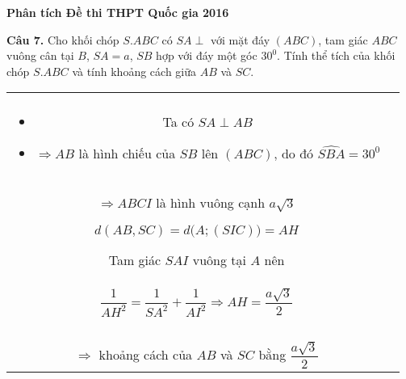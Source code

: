 \documentclass[11pt]{beamer} %
\newcommand{\parallelsum}{\mathbin{\!/\mkern-5mu/\!}}
\newcommand\Fontvi{\fontsize{9}{7.2}\selectfont}
\newcommand{\cau}[2]{\begin{block}{}
		{\color{red}\textbf{Câu #1.}} #2
	\end{block}
}
\newcommand{\divColSeven}[2]{\begin{tabular}{cc}
		\begin{minipage}[c]{4.3cm} 
			#1
		\end{minipage}&
		\begin{minipage}[c]{6.9cm} 
			#2
		\end{minipage}
	\end{tabular}
}
\begin{document}
\begin{frame}{\textbf{\qquad Phân tích Đề thi THPT Quốc gia 2016}}~\\[-15pt]
	\Fontvi
	\cau{7}{Cho khối chóp $S.ABC$ có $SA\perp$ với mặt đáy $(ABC)$, tam giác $ABC$ vuông cân tại $B$, $SA=a$, $SB$ hợp với đáy một góc $30^0$. Tính thể tích của khối chóp $S.ABC$ và tính khoảng cách giữa $AB$ và $SC$.}\pause
	\divColSeven{
		\begin{center}
			
		\end{center}~\\[-20pt]
		\begin{itemize}
			\setlength{\itemindent}{-0.4cm}
			\item Ta có $SA\perp AB$
			\item $\Rightarrow AB$ là hình chiếu của $SB$ lên $(ABC)$, do đó $\widehat{SBA}=30^0$
			
		\end{itemize}\pause 
	}{
		\begin{itemize}
		    \setlength{\itemindent}{-0.5cm}
			\item $\cot \widehat{SBA}=\dfrac{AB}{SA} \Rightarrow BC=a\sqrt{3}$
			\item $S_{ABC}=\dfrac{1}{2}AB.BC=\dfrac{1}{2}a\sqrt{3}.a\sqrt{3}=\dfrac{3a^2}{2}$
			\item $V=\frac{1}{3}SA.S_{ABC}=\dfrac{1}{3}.a.\dfrac{3a^2}{2}=\dfrac{a^3}{2}$
			\item Trong mp$(ABC)$, kẻ $AI\parallelsum BC$ và kẻ $CI\parallelsum AB$\\
			$\Rightarrow ABCI$ là hình vuông cạnh $a\sqrt{3}$
			\item $d(AB,SC)=d\Big(A;(SIC)\Big)=AH$
			\item Tam giác $SAI$ vuông tại $A$ nên\\[-15pt] $$\frac{1}{AH^2}=\frac{1}{SA^2}+\frac{1}{AI^2}\Rightarrow AH=\frac{a\sqrt{3}}{2}$$~\\[-0.4cm]
			$\Rightarrow$ khoảng cách của $AB$ và $SC$ bằng $\dfrac{a\sqrt{3}}{2}$
		\end{itemize}
	}
\end{frame}
\end{document}
